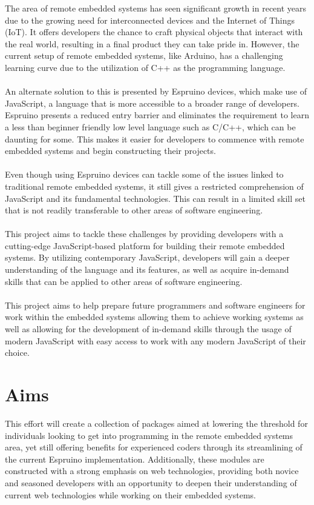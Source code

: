 \documentclass{l4proj}
\begin{document}
\text 
The area of remote embedded systems has seen significant growth in recent years due to the growing need for interconnected devices and the Internet of Things (IoT). It offers developers the chance to craft physical objects that interact with the real world, resulting in a final product they can take pride in. However, the current setup of remote embedded systems, like Arduino, has a challenging learning curve due to the utilization of C++ as the programming language.
\\ \\
An alternate solution to this is presented by Espruino devices, which make use of JavaScript, a language that is more accessible to a broader range of developers. Espruino presents a reduced entry barrier and eliminates the requirement to learn a less than beginner friendly low level language such as C/C++, which can be daunting for some. This makes it easier for developers to commence with remote embedded systems and begin constructing their projects.
\\ \\
Even though using Espruino devices can tackle some of the issues linked to traditional remote embedded systems, it still gives a restricted comprehension of JavaScript and its fundamental technologies. This can result in a limited skill set that is not readily transferable to other areas of software engineering.
\\ \\
This project aims to tackle these challenges by providing developers with a cutting-edge JavaScript-based platform for building their remote embedded systems. By utilizing contemporary JavaScript, developers will gain a deeper understanding of the language and its features, as well as acquire in-demand skills that can be applied to other areas of software engineering.
\\ \\
This project aims to help prepare future programmers and software engineers for work within the embedded systems allowing them to achieve working systems as well as allowing for the development of in-demand skills through the usage of modern JavaScript with easy access to work with any modern JavaScript of their choice.

\section{Aims}

\text This effort will create a collection of packages aimed at lowering the threshold for individuals looking to get into programming in the remote embedded systems area, yet still offering benefits for experienced coders through its streamlining of the current Espruino implementation. Additionally, these modules are constructed with a strong emphasis on web technologies, providing both novice and seasoned developers with an opportunity to deepen their understanding of current web technologies while working on their embedded systems.
\end{document}
